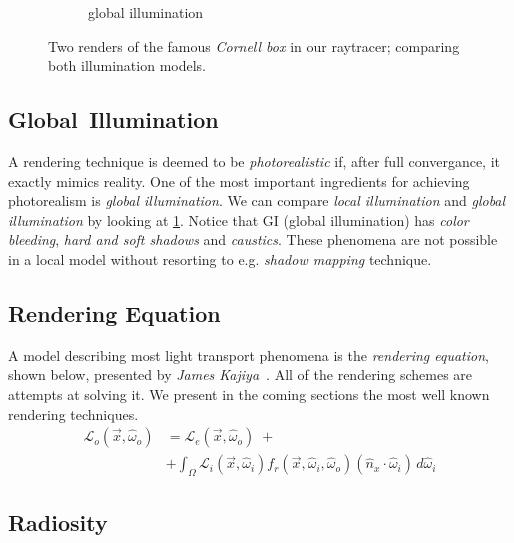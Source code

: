 \documentclass[a4paper, twocolumn]{article}
\begin{document}
\begin{figure}[ht]
\begin{subfigure}{0.48\linewidth}
            \caption{global illumination}
        \end{subfigure}
        \caption{Two renders of the famous \emph{Cornell box} in our raytracer; comparing both illumination models.}
        \label{fig:cornell_box}
    \end{figure}

    \vspace{-1.5em}

    \subsection{Global\, Illumination} \label{sec:global_illumination}

    A rendering technique is deemed to be \emph{photorealistic} if, after full convergance, it exactly mimics reality. One of the most important ingredients for achieving photorealism is \emph{global illumination}. We can compare \emph{local illumination} and \emph{global illumination} by looking at \cref{fig:cornell_box}. Notice that GI (global illumination) has \emph{color bleeding}, \emph{hard and soft shadows} and \emph{caustics}. These phenomena are not possible in a local model without resorting to e.g. \emph{shadow mapping} technique.

    \subsection{Rendering Equation} \label{sec:rendering_equation}

        A model describing most light transport phenomena is the \emph{rendering equation}, shown below, presented by \emph{James Kajiya}~\cite{kajiya1986rendering}. All of the rendering schemes are attempts at solving it. We present in the coming sections the most well known rendering techniques. \begin{align*}
            \mathcal{L}_o(\vec{x}, \hat{\omega}_o) &= \mathcal{L}_e(\vec{x}, \hat{\omega}_o) \; +\\
                                                   &+ \int_\Omega \mathcal{L}_i(\vec{x}, \hat{\omega}_i)
                                                      f_r(\vec{x}, \hat{\omega}_i, \hat{\omega}_o)
                                                      (\hat{n}_{x} \cdot \hat{\omega}_i) \, d\hat{\omega}_i
        \end{align*}

    \newpage

    \subsection{Radiosity} \label{sec:radiosity}
    
\end{document}
